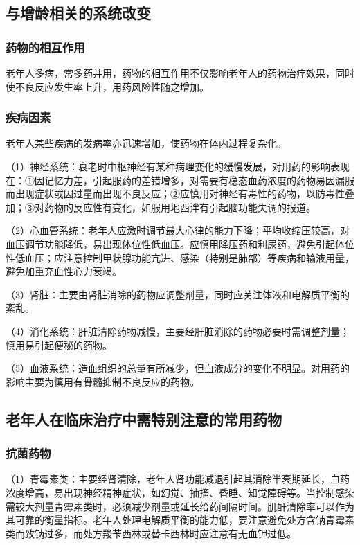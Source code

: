 \subsection{与增龄相关的系统改变}

\subsubsection{药物的相互作用}

老年人多病，常多药并用，药物的相互作用不仅影响老年人的药物治疗效果，同时使不良反应发生率上升，用药风险性随之增加。

\subsubsection{疾病因素}

老年人某些疾病的发病率亦迅速增加，使药物在体内过程复杂化。

（1）神经系统：衰老时中枢神经有某种病理变化的缓慢发展，对用药的影响表现在：①因记忆力差，引起服药的差错增多，对需要有稳态血药浓度的药物易因漏服而出现症状或因过量而出现不良反应；②应慎用对神经有毒性的药物，以防毒性叠加；③对药物的反应性有变化，如服用地西泮有引起脑功能失调的报道。

（2）心血管系统：老年人应激时调节最大心律的能力下降；平均收缩压较高，对血压调节功能降低，易出现体位性低血压。应慎用降压药和利尿药，避免引起体位性低血压；应注意控制甲状腺功能亢进、感染（特别是肺部）等疾病和输液用量，避免加重充血性心力衰竭。

（3）肾脏：主要由肾脏消除的药物应调整剂量，同时应关注体液和电解质平衡的紊乱。

（4）消化系统：肝脏清除药物减慢，主要经肝脏消除的药物必要时需调整剂量；慎用易引起便秘的药物。

（5）血液系统：造血组织的总量有所减少，但血液成分的变化不明显。对用药的影响主要为慎用有骨髓抑制不良反应的药物。

\subsection{老年人在临床治疗中需特别注意的常用药物}

\subsubsection{抗菌药物}

（1）青霉素类：主要经肾清除，老年人肾功能减退引起其消除半衰期延长，血药浓度增高，易出现神经精神症状，如幻觉、抽搐、昏睡、知觉障碍等。当控制感染需较大剂量青霉素类时，必须减少剂量或延长给药间隔时间。肌酐清除率可以作为其可靠的衡量指标。老年人处理电解质平衡的能力低，要注意避免处方含钠青霉素类而致钠过多，而处方羧苄西林或替卡西林时应注意有无血钾过低。

